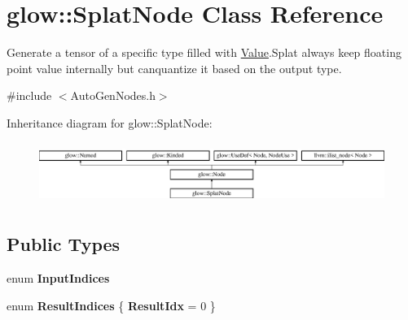 \hypertarget{classglow_1_1_splat_node}{}\section{glow\+:\+:Splat\+Node Class Reference}
\label{classglow_1_1_splat_node}


Generate a tensor of a specific type filled with \textquotesingle{}\hyperlink{classglow_1_1_value}{Value}\textquotesingle{}.Splat always keep floating point value internally but canquantize it based on the output type.  




{\ttfamily \#include $<$Auto\+Gen\+Nodes.\+h$>$}

Inheritance diagram for glow\+:\+:Splat\+Node\+:\begin{figure}[H]
\begin{center}
\leavevmode
\includegraphics[height=2.028986cm]{classglow_1_1_splat_node}
\end{center}
\end{figure}
\subsection*{Public Types}
\begin{DoxyCompactItemize}
\item 
\mbox{\label{classglow_1_1_splat_node_a0dbcb212de608ceef823021f25229788}} 
enum {\bfseries Input\+Indices} 
\item 
\mbox{\label{classglow_1_1_splat_node_a7dbd999eab9b0fc836fcdf9f4ebbd6a6}} 
enum {\bfseries Result\+Indices} \{ {\bfseries Result\+Idx} = 0
 \}
\end{DoxyCompactItemize}
